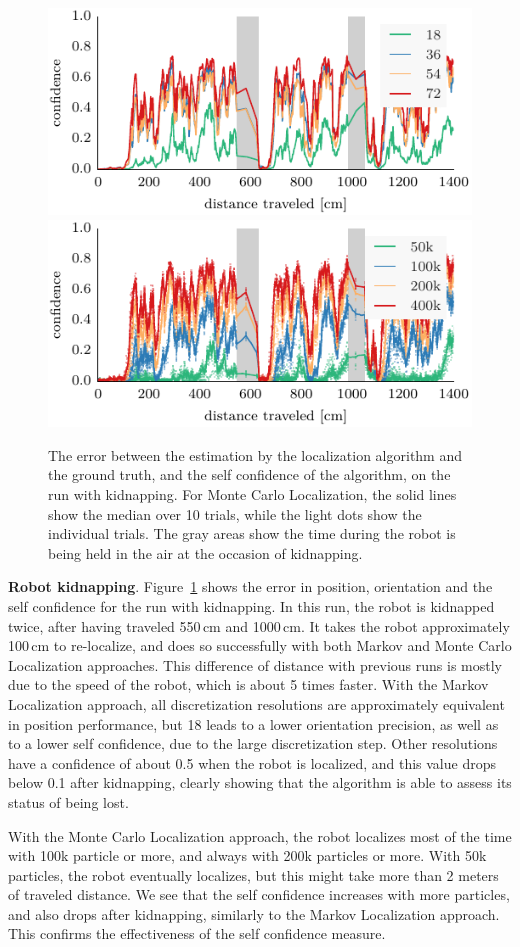 \documentclass{svmult}
\newcommand{\Fig}[1]{Figure~\ref{fig:#1}}
\begin{document}
\begin{figure}
\vspace{.2em}

\includegraphics[width=.5\columnwidth]{ml-whole_random_long-conf} \hfill \includegraphics[width=.5\columnwidth]{mcl-whole_random_long-conf}

\caption{The error between the estimation by the localization algorithm and the ground truth, and the self confidence of the algorithm, on the run with kidnapping.
For Monte Carlo Localization, the solid lines show the median over 10 trials, while the light dots show the individual trials.
The gray areas show the time during the robot is being held in the air at the occasion of kidnapping.}
\label{fig:whole-runs-random-long}
\end{figure}

\textbf{Robot kidnapping}.
\Fig{whole-runs-random-long} shows the error in position, orientation and the self confidence for the run with kidnapping.
In this run, the robot is kidnapped twice, after having traveled 550\,cm and 1000\,cm.
It takes the robot approximately 100\,cm to re-localize, and does so successfully with both Markov and Monte Carlo Localization approaches.
This difference of distance with previous runs is mostly due to the speed of the robot, which is about 5 times faster.
With the Markov Localization approach, all discretization resolutions are approximately equivalent in position performance, but 18 leads to a lower orientation precision, as well as to a lower self confidence, due to the large discretization step.
Other resolutions have a confidence of about 0.5 when the robot is localized, and this value drops below 0.1 after kidnapping, clearly showing that the algorithm is able to assess its status of being lost.

With the Monte Carlo Localization approach, the robot localizes most of the time with 100k particle or more, and always with 200k particles or more.
With 50k particles, the robot eventually localizes, but this might take more than 2 meters of traveled distance.
We see that the self confidence increases with more particles, and also drops after kidnapping, similarly to the Markov Localization approach.
This confirms the effectiveness of the self confidence measure.
\end{document}
